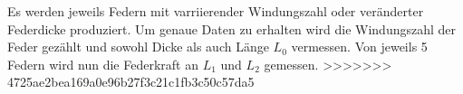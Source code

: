 Es werden jeweils Federn mit varriierender Windungszahl oder veränderter Federdicke produziert.
Um genaue Daten zu erhalten wird die Windungszahl der Feder gezählt und sowohl Dicke als auch Länge $L_0$ vermessen.
Von jeweils 5 Federn wird nun die Federkraft an $L_1$ und $L_2$ gemessen.
\label{sec:Durchfuehrung}
>>>>>>> 4725ae2bea169a0e96b27f3c21c1fb3c50c57da5
